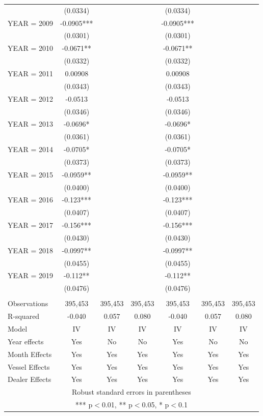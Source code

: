 \begin{tabular}{lcccccc}
 & (0.0334) &  &  & (0.0334) &  &  \\
YEAR = 2009 & -0.0905*** &  &  & -0.0905*** &  &  \\
 & (0.0301) &  &  & (0.0301) &  &  \\
YEAR = 2010 & -0.0671** &  &  & -0.0671** &  &  \\
 & (0.0332) &  &  & (0.0332) &  &  \\
YEAR = 2011 & 0.00908 &  &  & 0.00908 &  &  \\
 & (0.0343) &  &  & (0.0343) &  &  \\
YEAR = 2012 & -0.0513 &  &  & -0.0513 &  &  \\
 & (0.0346) &  &  & (0.0346) &  &  \\
YEAR = 2013 & -0.0696* &  &  & -0.0696* &  &  \\
 & (0.0361) &  &  & (0.0361) &  &  \\
YEAR = 2014 & -0.0705* &  &  & -0.0705* &  &  \\
 & (0.0373) &  &  & (0.0373) &  &  \\
YEAR = 2015 & -0.0959** &  &  & -0.0959** &  &  \\
 & (0.0400) &  &  & (0.0400) &  &  \\
YEAR = 2016 & -0.123*** &  &  & -0.123*** &  &  \\
 & (0.0407) &  &  & (0.0407) &  &  \\
YEAR = 2017 & -0.156*** &  &  & -0.156*** &  &  \\
 & (0.0430) &  &  & (0.0430) &  &  \\
YEAR = 2018 & -0.0997** &  &  & -0.0997** &  &  \\
 & (0.0455) &  &  & (0.0455) &  &  \\
YEAR = 2019 & -0.112** &  &  & -0.112** &  &  \\
 & (0.0476) &  &  & (0.0476) &  &  \\
 &  &  &  &  &  &  \\
Observations & 395,453 & 395,453 & 395,453 & 395,453 & 395,453 & 395,453 \\
R-squared & -0.040 & 0.057 & 0.080 & -0.040 & 0.057 & 0.080 \\
Model & IV & IV & IV & IV & IV & IV \\
Year effects & Yes & No & No & Yes & No & No \\
Month Effects & Yes & Yes & Yes & Yes & Yes & Yes \\
Vessel Effects & Yes & Yes & Yes & Yes & Yes & Yes \\
 Dealer Effects & Yes & Yes & Yes & Yes & Yes & Yes \\ \hline
\multicolumn{7}{c}{ Robust standard errors in parentheses} \\
\multicolumn{7}{c}{ *** p$<$0.01, ** p$<$0.05, * p$<$0.1} \\
\end{tabular}
